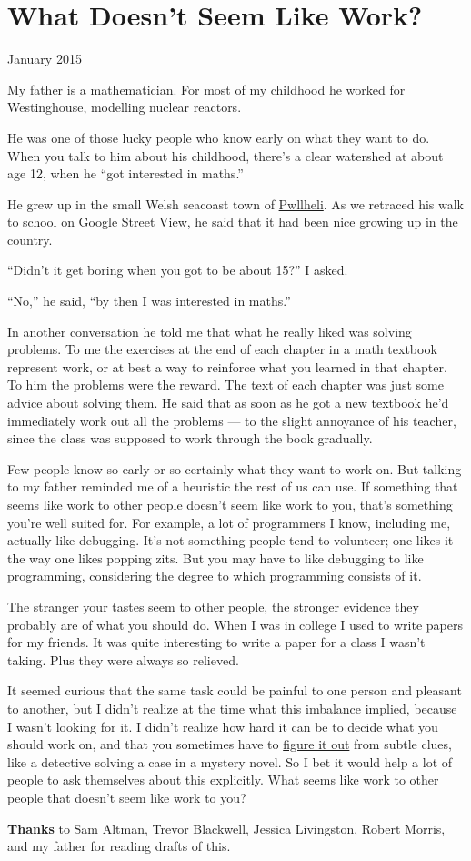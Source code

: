 \chapter{What Doesn't Seem Like Work?}

January 2015

My father is a mathematician. For most of my childhood he worked for
Westinghouse, modelling nuclear reactors.

He was one of those lucky people who know early on what they want to do.
When you talk to him about his childhood, there's a clear watershed at
about age 12, when he ``got interested in maths.''

He grew up in the small Welsh seacoast town of
\href{https://goo.gl/maps/rkzUm}{Pwllheli}. As we retraced his walk to
school on Google Street View, he said that it had been nice growing up
in the country.

``Didn't it get boring when you got to be about 15?'' I asked.

``No,'' he said, ``by then I was interested in maths.''

In another conversation he told me that what he really liked was solving
problems. To me the exercises at the end of each chapter in a math
textbook represent work, or at best a way to reinforce what you learned
in that chapter. To him the problems were the reward. The text of each
chapter was just some advice about solving them. He said that as soon as
he got a new textbook he'd immediately work out all the problems --- to
the slight annoyance of his teacher, since the class was supposed to
work through the book gradually.

Few people know so early or so certainly what they want to work on. But
talking to my father reminded me of a heuristic the rest of us can use.
If something that seems like work to other people doesn't seem like work
to you, that's something you're well suited for. For example, a lot of
programmers I know, including me, actually like debugging. It's not
something people tend to volunteer; one likes it the way one likes
popping zits. But you may have to like debugging to like programming,
considering the degree to which programming consists of it.

The stranger your tastes seem to other people, the stronger evidence
they probably are of what you should do. When I was in college I used to
write papers for my friends. It was quite interesting to write a paper
for a class I wasn't taking. Plus they were always so relieved.

It seemed curious that the same task could be painful to one person and
pleasant to another, but I didn't realize at the time what this
imbalance implied, because I wasn't looking for it. I didn't realize how
hard it can be to decide what you should work on, and that you sometimes
have to \href{love.html}{figure it out} from subtle clues, like a
detective solving a case in a mystery novel. So I bet it would help a
lot of people to ask themselves about this explicitly. What seems like
work to other people that doesn't seem like work to you?

\textbf{Thanks} to Sam Altman, Trevor Blackwell, Jessica Livingston,
Robert Morris, and my father for reading drafts of this.
